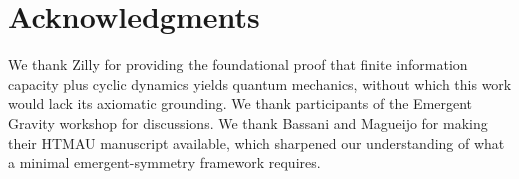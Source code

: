 \documentclass[aps,prd,twocolumn,showpacs,superscriptaddress,preprintnumbers]{revtex4-2}
\begin{document}
\section*{Acknowledgments}

We thank Zilly for providing the foundational proof that finite information capacity plus cyclic dynamics yields quantum mechanics, without which this work would lack its axiomatic grounding.
We thank participants of the Emergent Gravity workshop for discussions.
We thank Bassani and Magueijo for making their HTMAU manuscript available, which sharpened our understanding of what a minimal emergent-symmetry framework requires.


\end{document}
